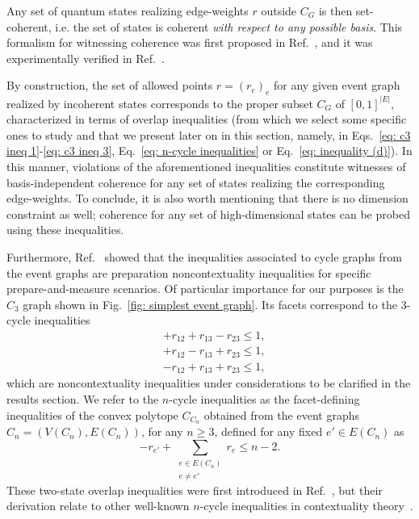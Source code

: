 \documentclass[a4paper,twocolumn,11pt,accepted=2024-01-17]{quantumarticle}
\begin{document}
Any set of quantum states realizing edge-weights $r$ outside $C_G$ is then {set-coherent, i.e. the set of states is coherent} \textit{with respect to any possible basis}. This formalism for witnessing coherence was first proposed in Ref.~\cite{galvaobroad2020quantumandclassical}, and it was experimentally verified in Ref.~\cite{giordani2021witnessesofcoherence}.


By construction, { the set of allowed points $r = (r_e)_e$ for any given event graph realized by incoherent states corresponds to the proper subset $C_G$ of $[0,1]^{|E|}$, characterized in terms of overlap inequalities  (from which we select some specific ones to study and that we present later on in this section, namely, in Eqs.~\eqref{eq: c3 ineq 1}-\eqref{eq: c3 ineq 3}, Eq.~\eqref{eq: n-cycle inequalities} or Eq.~\eqref{eq: inequality (d)}). In this manner, violations of the aforementioned inequalities constitute witnesses of basis-independent coherence for any set of states realizing the corresponding edge-weights. To conclude, it is also worth mentioning that} there is no dimension constraint as well; coherence for any set of high-dimensional states can be probed using these inequalities.

Furthermore,  Ref.~\cite{wagner2022inequalities} showed that the inequalities associated to cycle graphs from the event graphs are preparation noncontextuality inequalities for specific prepare-and-measure scenarios. Of particular importance for our purposes is the $C_3$ graph shown in Fig.~\ref{fig: simplest event graph}. Its facets correspond to the { $3$-cycle }inequalities
\begin{align}
    &+r_{12}+r_{13}-r_{23} \leq 1,\label{eq: c3 ineq 1}\\
    &+r_{12}-r_{13}+r_{23} \leq 1,\label{eq: c3 ineq 2}\\
    &-r_{12}+r_{13}+r_{23} \leq 1,\label{eq: c3 ineq 3}
\end{align}
which are noncontextuality inequalities under considerations to be clarified in the results section. { We refer to the $n$-cycle inequalities as the facet-defining inequalities of the convex polytope $C_{C_n}$ obtained from the event graphs $C_n = (V(C_n), E(C_n))$, for any $n\geq 3$, defined for any fixed $e' \in E(C_n)$ as
\begin{equation}\label{eq: n-cycle inequalities}
    -r_{e'} + \sum_{\begin{array}{c}e \in E(C_n)\\ e\neq e' \end{array}}r_e \leq n-2.
\end{equation}
These two-state overlap inequalities were first introduced in Ref.~\cite{galvaobroad2020quantumandclassical}, but their derivation relate to other well-known $n$-cycle inequalities in contextuality theory~\cite{araujo2013all}.}
\end{document}

